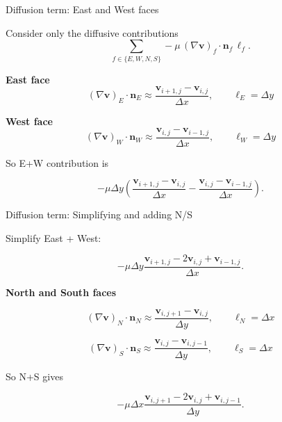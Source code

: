 \documentclass[aspectratio=169]{beamer}
\begin{document}
\begin{frame}{Diffusion term: East and West faces}

Consider only the diffusive contributions
\[
\sum_{f\in\{E,W,N,S\}}
-
\mu\,(\nabla\mathbf{v})_f\cdot\mathbf{n}_f\,\ell_f.
\]

\bigskip
\textbf{East face}
\[
(\nabla\mathbf{v})_E\cdot\mathbf{n}_E
\approx
\frac{\mathbf{v}_{i+1,j}-\mathbf{v}_{i,j}}{\Delta x},
\qquad
\ell_E=\Delta y
\]

\textbf{West face}
\[
(\nabla\mathbf{v})_W\cdot\mathbf{n}_W
\approx
\frac{\mathbf{v}_{i,j}-\mathbf{v}_{i-1,j}}{\Delta x},
\qquad
\ell_W=\Delta y
\]

\bigskip
So E+W contribution is

\[
-\mu \Delta y
\left(
\frac{\mathbf{v}_{i+1,j}-\mathbf{v}_{i,j}}{\Delta x}
-
\frac{\mathbf{v}_{i,j}-\mathbf{v}_{i-1,j}}{\Delta x}
\right).
\]

\end{frame}
\begin{frame}{Diffusion term: Simplifying and adding N/S}

Simplify East + West:

\[
-\mu \Delta y
\frac{\mathbf{v}_{i+1,j}-2\mathbf{v}_{i,j}+\mathbf{v}_{i-1,j}}{\Delta x}.
\]

\bigskip
\textbf{North and South faces}

\[
(\nabla\mathbf{v})_N\cdot\mathbf{n}_N
\approx
\frac{\mathbf{v}_{i,j+1}-\mathbf{v}_{i,j}}{\Delta y},
\qquad
\ell_N=\Delta x
\]

\[
(\nabla\mathbf{v})_S\cdot\mathbf{n}_S
\approx
\frac{\mathbf{v}_{i,j}-\mathbf{v}_{i,j-1}}{\Delta y},
\qquad
\ell_S=\Delta x
\]

\bigskip
So N+S gives

\[
-\mu \Delta x
\frac{\mathbf{v}_{i,j+1}-2\mathbf{v}_{i,j}+\mathbf{v}_{i,j-1}}{\Delta y}.
\]

\end{frame}
\end{document}
